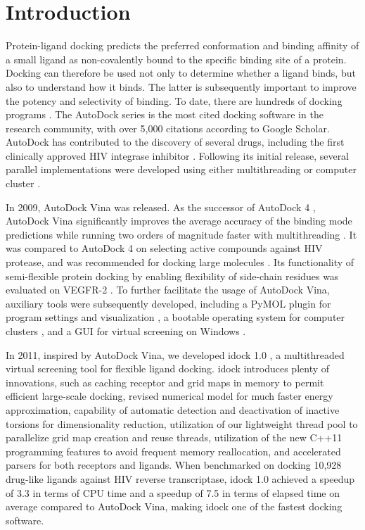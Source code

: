 \documentclass[10pt]{article}
\begin{document}

\section*{Introduction}
Protein-ligand docking predicts the preferred conformation and binding affinity of a small ligand as non-covalently bound to the specific binding site of a protein. Docking can therefore be used not only to determine whether a ligand binds, but also to understand how it binds. The latter is subsequently important to improve the potency and selectivity of binding. To date, there are hundreds of docking programs \cite{493,922}. The AutoDock series \cite{597,596,595} is the most cited docking software in the research community, with over 5,000 citations according to Google Scholar. AutoDock has contributed to the discovery of several drugs, including the first clinically approved HIV integrase inhibitor \cite{1169}. Following its initial release, several parallel implementations were developed using either multithreading or computer cluster \cite{115,560,782}.

In 2009, AutoDock Vina \cite{595} was released. As the successor of AutoDock 4 \cite{596}, AutoDock Vina significantly improves the average accuracy of the binding mode predictions while running two orders of magnitude faster with multithreading \cite{595}. It was compared to AutoDock 4 on selecting active compounds against HIV protease, and was recommended for docking large molecules \cite{556}. Its functionality of semi-flexible protein docking by enabling flexibility of side-chain residues was evaluated on VEGFR-2 \cite{1084}. To further facilitate the usage of AutoDock Vina, auxiliary tools were subsequently developed, including a PyMOL \cite{1221} plugin for program settings and visualization \cite{609}, a bootable operating system for computer clusters \cite{773}, and a GUI for virtual screening on Windows \cite{1250}.

In 2011, inspired by AutoDock Vina, we developed idock 1.0 \cite{1153}, a multithreaded virtual screening tool for flexible ligand docking. idock introduces plenty of innovations, such as caching receptor and grid maps in memory to permit efficient large-scale docking, revised numerical model for much faster energy approximation, capability of automatic detection and deactivation of inactive torsions for dimensionality reduction, utilization of our lightweight thread pool to parallelize grid map creation and reuse threads, utilization of the new C++11 programming features to avoid frequent memory reallocation, and accelerated parsers for both receptors and ligands. When benchmarked on docking 10,928 drug-like ligands against HIV reverse transcriptase, idock 1.0 achieved a speedup of 3.3 in terms of CPU time and a speedup of 7.5 in terms of elapsed time on average compared to AutoDock Vina, making idock one of the fastest docking software.
\end{document}
